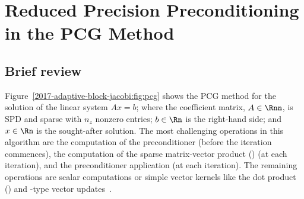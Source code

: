 \section{Reduced Precision Preconditioning in the PCG Method}
\label{2017-adaptive-block-jacobi:sec:cg}

\subsection{Brief review}

\newcommand{\fpd}{\mbox{\rm fp64}\xspace}
\newcommand{\fps}{\mbox{\rm fp32}\xspace}
\newcommand{\fph}{\mbox{\rm fp16}\xspace}
\newcommand{\fpv}{\mbox{\rm fpxx}\xspace}
\newcommand{\inti}{\mbox{\rm int32}\xspace}

Figure~\ref{2017-adaptive-block-jacobi:fig:pcg} shows the PCG method for the solution of the linear system
$Ax=b$; where the coefficient matrix, $A \in \Rnn$, is SPD and sparse with $n_z$
nonzero entries; $b \in \Rn$ is the right-hand side; and
$x \in \Rn$ is the sought-after solution. The most challenging operations in
this algorithm are the computation of the preconditioner (before the iteration
commences), the computation of the sparse matrix-vector product (\spmv) (at 
each iteration), 
and the preconditioner application (at each iteration). The
remaining operations are scalar computations or simple vector kernels like
the dot product (\dotp) and \axpy-type vector updates~\cite{barrettemplates}.


